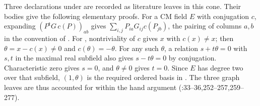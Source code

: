 Three declarations under  are recorded as
literature leaves in this cone. Their bodies give the following
elementary proofs. For a CM field $E$ with conjugation $c$, expanding
$(P^{\mathsf t}G\,c(P))_{ab}$ gives
$\sum_{i,j}P_{ia}G_{ij}c(P_{jb})$, the pairing of columns $a,b$
in the convention of . For ,
nontriviality of $c$ gives $x$ with $c(x)\ne x$; then
$\theta=x-c(x)\ne0$ and $c(\theta)=-\theta$. For any such $\theta$,
a relation $s+t\theta=0$ with $s,t$ in the maximal real subfield
also gives $s-t\theta=0$ by conjugation. Characteristic zero gives
$s=0$, and $\theta\ne0$ gives $t=0$. Since $E$ has degree two over
that subfield, $(1,\theta)$ is the required ordered basis in
. The three graph leaves are thus
accounted for within the hand argument (:33--36,252--257,259--277).

